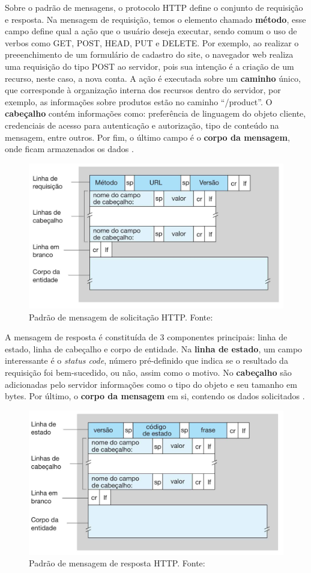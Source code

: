 Sobre o padrão de mensagens, o protocolo HTTP define o conjunto de requisição e resposta. Na mensagem de requisição, temos o elemento
chamado \textbf{método}, esse campo define qual a ação que o usuário deseja executar, sendo comum o uso de verbos
como GET, POST, HEAD, PUT e DELETE. Por exemplo, ao realizar o preeenchimento de um formulário de cadastro do site, o
navegador web realiza uma requisição do tipo POST ao servidor, pois sua intenção é a criação de um recurso,
neste caso, a nova conta. A ação é executada sobre um \textbf{caminho} único, que corresponde à organização interna dos recursos 
dentro do servidor, por exemplo, as informações sobre produtos estão no caminho ``/product''. O \textbf{cabeçalho} contém informações como: preferência de linguagem do objeto cliente,
credenciais de acesso para autenticação e autorização, tipo de conteúdo na mensagem, entre outros. Por fim, o último campo é o \textbf{corpo da mensagem}, 
onde ficam armazenados os dados \cite[pp. 77]{redeskurose2010}.

\begin{figure}[ht]
    \centering
    \includegraphics[width=.55\textwidth]{img/mensagem-http-solicitação.png}
    \caption{Padrão de mensagem de solicitação HTTP. Fonte: \cite{redeskurose2010}}\label{figMessageRequest}
\end{figure}

A mensagem de resposta é constituída de 3 componentes principais: linha de estado, linha de cabeçalho e corpo de entidade. Na \textbf{linha de estado}, um campo
interessante é o \textit{status code}, número pré-definido que indica se o resultado da requisição foi bem-sucedido, ou não, assim como o motivo. No \textbf{cabeçalho}
são adicionadas pelo servidor informações como o tipo do objeto e seu tamanho em bytes. Por último, o \textbf{corpo da mensagem} em si, contendo os dados solicitados \cite[pp. 78]{redeskurose2010}.

\begin{figure}[ht]
    \centering
    \includegraphics[width=.55\textwidth]{img/mensagem-http-resposta.png}
    \caption{Padrão de mensagem de resposta HTTP. Fonte: \cite{redeskurose2010}}\label{figMessageResponse}
\end{figure}

